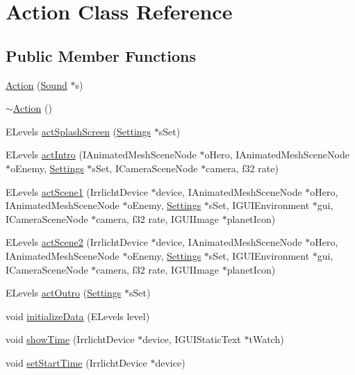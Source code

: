 \hypertarget{class_action}{
\section{Action Class Reference}
\label{class_action}
}
\subsection*{Public Member Functions}
\begin{DoxyCompactItemize}
\item 
\hyperlink{class_action_a4ec61016a46dfe617d94ee67b0c1670c}{Action} (\hyperlink{class_sound}{Sound} $\ast$s)
\item 
\hyperlink{class_action_acdb06775d157339256a8ecd55749226c}{$\sim$Action} ()
\item 
ELevels \hyperlink{class_action_afe35837862a01951fdf63f853bd79d48}{actSplashScreen} (\hyperlink{struct_settings}{Settings} $\ast$sSet)
\item 
ELevels \hyperlink{class_action_a2368aab6973f05206b296b39756dcbdc}{actIntro} (IAnimatedMeshSceneNode $\ast$oHero, IAnimatedMeshSceneNode $\ast$oEnemy, \hyperlink{struct_settings}{Settings} $\ast$sSet, ICameraSceneNode $\ast$camera, f32 rate)
\item 
ELevels \hyperlink{class_action_aa18c8609e5caabcb26d3c6b93d92159b}{actScene1} (IrrlichtDevice $\ast$device, IAnimatedMeshSceneNode $\ast$oHero, IAnimatedMeshSceneNode $\ast$oEnemy, \hyperlink{struct_settings}{Settings} $\ast$sSet, IGUIEnvironment $\ast$gui, ICameraSceneNode $\ast$camera, f32 rate, IGUIImage $\ast$planetIcon)
\item 
ELevels \hyperlink{class_action_af11f32ac4273cc82c15cf5f3263c8a51}{actScene2} (IrrlichtDevice $\ast$device, IAnimatedMeshSceneNode $\ast$oHero, IAnimatedMeshSceneNode $\ast$oEnemy, \hyperlink{struct_settings}{Settings} $\ast$sSet, IGUIEnvironment $\ast$gui, ICameraSceneNode $\ast$camera, f32 rate, IGUIImage $\ast$planetIcon)
\item 
ELevels \hyperlink{class_action_ac563c0b77763d7f05e8168e4c3737ab6}{actOutro} (\hyperlink{struct_settings}{Settings} $\ast$sSet)
\item 
void \hyperlink{class_action_a7839a872e9878d62b67a5c5919a4f1d9}{initializeData} (ELevels level)
\item 
void \hyperlink{class_action_a729929419a9d90402f0a882257725472}{showTime} (IrrlichtDevice $\ast$device, IGUIStaticText $\ast$tWatch)
\item 
void \hyperlink{class_action_a2c16320affb3e146dfd846c381f1eb2e}{setStartTime} (IrrlichtDevice $\ast$device)
\end{DoxyCompactItemize}
